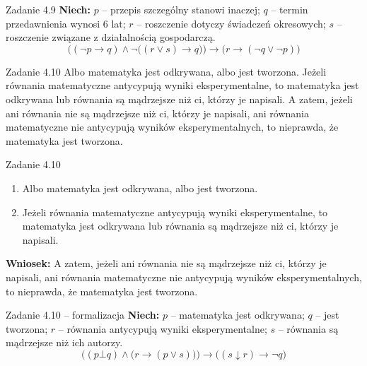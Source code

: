\documentclass[12pt]{beamer}
\begin{document}
\begin{frame}{Zadanie 4.9}
\small
\textbf{Niech:} $p$ -- przepis szczególny stanowi inaczej; $q$ -- termin przedawnienia wynosi 6 lat; $r$ -- roszczenie dotyczy świadczeń okresowych; $s$ -- roszczenie związane z działalnością gospodarczą.
\vspace{10pt}
\[ \Big((\neg p \rightarrow q) \wedge \neg\big((r \vee s) \rightarrow q\big)\Big) \rightarrow \big(r \rightarrow (\neg q \vee \neg p)\big) \]
\end{frame}

\begin{frame}{Zadanie 4.10}
Albo matematyka jest odkrywana, albo jest tworzona. Jeżeli równania matematyczne antycypują wyniki eksperymentalne, to matematyka jest odkrywana lub równania są mądrzejsze niż ci, którzy je napisali. A zatem, jeżeli ani równania nie są mądrzejsze niż ci, którzy je napisali, ani równania matematyczne nie antycypują wyników eksperymentalnych, to nieprawda, że matematyka jest tworzona.
\end{frame}

\begin{frame}{Zadanie 4.10}
\begin{enumerate}
    \item[P1.] Albo matematyka jest odkrywana, albo jest tworzona.
    \item[P2.] Jeżeli równania matematyczne antycypują wyniki eksperymentalne, to matematyka jest odkrywana lub równania są mądrzejsze niż ci, którzy je napisali.
\end{enumerate}
\vspace{6pt}
\textbf{Wniosek:} A zatem, jeżeli ani równania nie są mądrzejsze niż ci, którzy je napisali, ani równania matematyczne nie antycypują wyników eksperymentalnych, to nieprawda, że matematyka jest tworzona.
\end{frame}

\begin{frame}{Zadanie 4.10 -- formalizacja}
\textbf{Niech:} $p$ -- matematyka jest odkrywana; $q$ -- jest tworzona; $r$ -- równania antycypują wyniki eksperymentalne; $s$ -- równania są mądrzejsze niż ich autorzy.
\vspace{10pt}
\[ \Big((p \bot q) \wedge \big(r \rightarrow (p \vee s)\big)\Big) \rightarrow \big((s \downarrow r) \rightarrow \neg q\big) \]
\end{frame}
\end{document}
